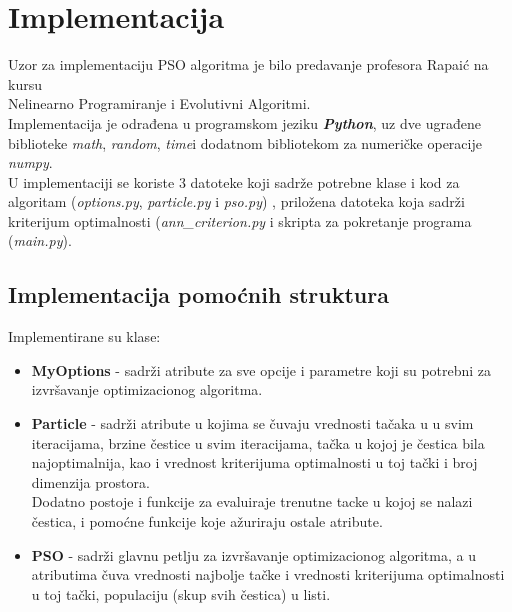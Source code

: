 \documentclass[12pt, a4paper]{article}
\begin{document}
    
    \section{Implementacija}
    Uzor za implementaciju PSO algoritma je bilo predavanje profesora Rapaić na kursu\\
    Nelinearno Programiranje i Evolutivni Algoritmi.\\
    
    Implementacija je odrađena u programskom jeziku \textit{\textbf{Python}}, uz dve ugrađene     biblioteke \textit{math}, \textit{random}, \textit{time}\space i dodatnom bibliotekom za numeričke
    operacije \textit{numpy}.\\
    U implementaciji se koriste 3 datoteke koji sadrže potrebne klase i    kod za algoritam (\textit{options.py}, \textit{particle.py} i \textit{pso.py}) , priložena
    datoteka koja sadrži kriterijum optimalnosti (\textit{ann\_criterion.py} i skripta za    pokretanje programa (\textit{main.py}).   \\
    
    \newpage
    
    \subsection{Implementacija pomoćnih struktura}
    
        Implementirane su klase:
        \begin{itemize}
            \item \textbf{MyOptions} - sadrži atribute za sve opcije i parametre koji su potrebni za izvršavanje optimizacionog algoritma.
            \item \textbf{Particle} - sadrži atribute u kojima se čuvaju vrednosti tačaka u u svim iteracijama, brzine čestice u svim iteracijama, tačka u kojoj je čestica bila najoptimalnija, kao i vrednost kriterijuma optimalnosti u toj tački i broj dimenzija prostora.\\
            Dodatno postoje i funkcije za evaluiraje trenutne tacke u kojoj se nalazi čestica, i pomoćne funkcije koje ažuriraju ostale atribute.
            \item \textbf{PSO} - sadrži glavnu petlju za izvršavanje optimizacionog algoritma, a u atributima čuva vrednosti najbolje tačke i vrednosti kriterijuma optimalnosti u toj tački, populaciju (skup svih čestica) u  listi.
        \end{itemize}
    
\end{document}
